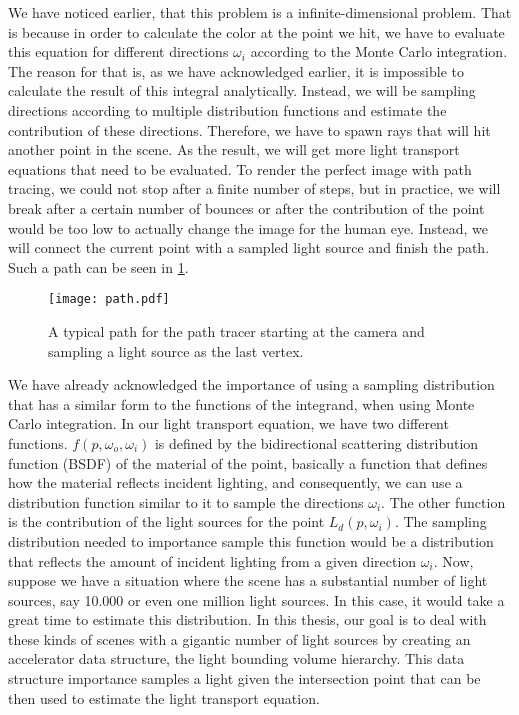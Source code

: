 We have noticed earlier, that this problem is a infinite-dimensional problem. That is because in order to calculate the color at the point we hit, we have to evaluate this equation for different directions $\omega_i$ according to the Monte Carlo integration. The reason for that is, as we have acknowledged earlier, it is impossible to calculate the result of this integral analytically. Instead, we will be sampling directions according to multiple distribution functions and estimate the contribution of these directions. Therefore, we have to spawn rays that will hit another point in the scene. As the result, we will get more light transport equations that need to be evaluated. To render the perfect image with path tracing, we could not stop after a finite number of steps, but in practice, we will break after a certain number of bounces or after the contribution of the point would be too low to actually change the image for the human eye. Instead, we will connect the current point with a sampled light source and finish the path. Such a path can be seen in \ref{fig:path}.

\begin{figure}
	\begin{center}
		\texttt{[image: path.pdf]}
		\caption{A typical path for the path tracer starting at the camera and sampling a light source as the last vertex.}
		\label{fig:path}
	\end{center}
\end{figure}

We have already acknowledged the importance of using a sampling distribution that has a similar form to the functions of the integrand, when using Monte Carlo integration. In our light transport equation, we have two different functions. $f(p, \omega_o, \omega_i)$ is defined by the bidirectional scattering distribution function (BSDF) of the material of the point, basically a function that defines how the material reflects incident lighting, and consequently, we can use a distribution function similar to it to sample the directions $\omega_i$. The other function is the contribution of the light sources for the point $L_d(p, \omega_i)$. The sampling distribution needed to importance sample this function would be a distribution that reflects the amount of incident lighting from a given direction $\omega_i$. Now, suppose we have a situation where the scene has a substantial number of light sources, say 10.000 or even one million light sources. In this case, it would take a great time to estimate this distribution. In this thesis, our goal is to deal with these kinds of scenes with a gigantic number of light sources by creating an accelerator data structure, the light bounding volume hierarchy. This data structure importance samples a light given the intersection point that can be then used to estimate the light transport equation.